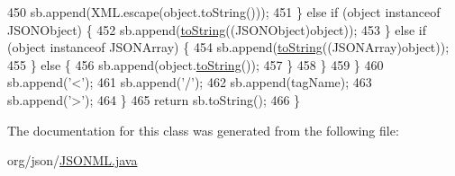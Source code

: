 \begin{DoxyCode}
450                         sb.append(XML.escape(\textcolor{keywordtype}{object}.toString()));
451                     \} \textcolor{keywordflow}{else} \textcolor{keywordflow}{if} (\textcolor{keywordtype}{object} instanceof JSONObject) \{
452                         sb.append(\hyperlink{classorg_1_1json_1_1_j_s_o_n_m_l_aeb4921c45210936fbcd3a527e1df88fd}{toString}((JSONObject)\textcolor{keywordtype}{object}));
453                     \} \textcolor{keywordflow}{else} \textcolor{keywordflow}{if} (\textcolor{keywordtype}{object} instanceof JSONArray) \{
454                         sb.append(\hyperlink{classorg_1_1json_1_1_j_s_o_n_m_l_aeb4921c45210936fbcd3a527e1df88fd}{toString}((JSONArray)\textcolor{keywordtype}{object}));
455                     \} \textcolor{keywordflow}{else} \{
456                         sb.append(\textcolor{keywordtype}{object}.\hyperlink{classorg_1_1json_1_1_j_s_o_n_m_l_aeb4921c45210936fbcd3a527e1df88fd}{toString}());
457                     \}
458                 \}
459             \}
460             sb.append(\textcolor{charliteral}{'<'});
461             sb.append(\textcolor{charliteral}{'/'});
462             sb.append(tagName);
463             sb.append(\textcolor{charliteral}{'>'});
464         \}
465         \textcolor{keywordflow}{return} sb.toString();
466     \}
\end{DoxyCode}


The documentation for this class was generated from the following file\-:\begin{DoxyCompactItemize}
\item 
org/json/\hyperlink{_j_s_o_n_m_l_8java}{J\-S\-O\-N\-M\-L.\-java}\end{DoxyCompactItemize}
